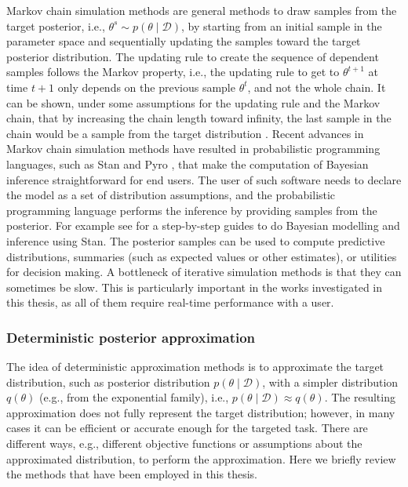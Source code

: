 \documentclass[dissertation,math,vertlayout,pdfa,colorlinks]{aaltoseries}
\newcommand{\bD}{\mathcal{D}}
\begin{document}
Markov chain simulation methods are general methods to draw samples from the target posterior, i.e., $\theta^s \sim p(\theta \mid \bD)$, by starting from an initial sample in the parameter space and sequentially updating the samples toward the target posterior distribution. The updating rule to create the sequence of dependent samples follows the Markov property, i.e., the updating rule to get to $\theta^{t+1}$ at time $t+1$ only depends on the previous sample $\theta^t$, and not the whole chain. %
It can be shown, under some assumptions for the updating rule and the Markov chain, that by increasing the chain length toward infinity, the last sample in the chain would be a sample from the target distribution \cite[Chapter~11]{Gelman2013}. Recent advances in Markov chain simulation methods have resulted in probabilistic programming languages, such as Stan \cite{STAN} and Pyro \cite{bingham2018pyro}, that make the computation of Bayesian inference straightforward for end users. The user of such software needs to declare the model as a set of distribution assumptions, and the probabilistic programming language performs the inference by providing samples from the posterior. For example see \cite{Bayesian_workflow_cog_sci_2019} for a step-by-step guides to do Bayesian modelling and inference using Stan. The posterior samples can be used to compute predictive distributions, summaries (such as expected values or other estimates), or utilities for decision making. A bottleneck of iterative simulation methods is that they can sometimes be slow. This is particularly important in the works investigated in this thesis, as all of them require real-time performance with a user.

\subsubsection{Deterministic posterior approximation}

The idea of deterministic approximation methods is to approximate the target distribution, such as posterior distribution $p(\theta \mid \bD)$, with a simpler distribution $q(\theta)$ (e.g., from the exponential family), i.e., $p(\theta \mid \bD) \approx q(\theta)$. The resulting approximation does not fully represent the target distribution; however, in many cases it can be efficient or accurate enough for the targeted task. There are different ways, e.g., different objective functions or assumptions about the approximated distribution, to perform the approximation. Here we briefly review the methods that have been employed in this thesis. 
\end{document}
